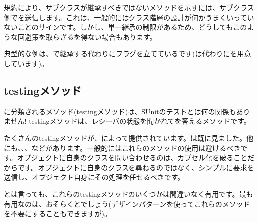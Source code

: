 \documentclass[a4paper,10pt,twoside]{book}
\begin{document}
規約により、サブクラスが継承すべきではないメソッドを示すには、サブクラス側でを送信します。これは、一般的にはクラス階層の設計が何かうまくいっていないことのサインです。しかし、単一継承の制限があるため、どうしてもこのような回避策を取らざるを得ない場合もあります。

典型的な例は、で継承する代わりにフラグを立てているです(は代わりにを用意しています)。



\subsection{testingメソッド}

 に分類されるメソッド(testingメソッド)は、SUnitのテストとは何の関係もありません! testingメソッドは、レシーバの状態を聞かれてを答えるメソッドです。

たくさんのtestingメソッドが、によって提供されています。は既に見ました。他にも、、、などがあります。一般的にはこれらのメソッドの使用は避けるべきです。オブジェクトに自身のクラスを問い合わせるのは、カプセル化を破ることだからです。オブジェクトに自身のクラスを尋ねるのではなく、シンプルに要求を送信し、オブジェクト自身にその処理を任せるべきです。

とは言っても、これらのtestingメソッドのいくつかは間違いなく有用です。最も有用なのは、おそらくとでしょう(\cite{Wool98a}デザインパターンを使ってこれらのメソッドを不要にすることもできますが)。


\end{document}
